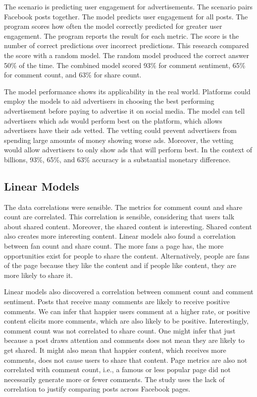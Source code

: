 \documentclass{article}
\begin{document}
The scenario is predicting user engagement for advertisements. The scenario pairs Facebook posts together. The model predicts user engagement for all posts. The program scores how often the model correctly predicted for greater user engagement. The program reports the result for each metric. The score is the number of correct predictions over incorrect predictions. This research compared the score with a random model. The random model produced the correct answer 50\% of the time. The combined model scored 93\% for comment sentiment, 65\% for comment count, and 63\% for share count.

The model performance shows its applicability in the real world.  Platforms could employ the models to aid advertisers in choosing the best performing advertisement before paying to advertise it on social media. The model can tell advertisers which ads would perform best on the platform, which allows advertisers have their ads vetted. The vetting could prevent advertisers from spending large amounts of money showing worse ads. Moreover, the vetting would allow advertisers to only show ads that will perform best. In the context of billions, 93\%, 65\%, and 63\% accuracy is a substantial monetary difference.

\subsection{Linear Models}
The data correlations were sensible. The metrics for comment count and share count are correlated. This correlation is sensible, considering that users talk about shared content. Moreover, the shared content is interesting. Shared content also creates more interesting content. Linear models also found a correlation between fan count and share count. The more fans a page has, the more opportunities exist for people to share the content. Alternatively, people are fans of the page because they like the content and if people like content, they are more likely to share it. 

Linear models also discovered a correlation between comment count and comment sentiment. Posts that receive many comments are likely to receive positive comments. We can infer that happier users comment at a higher rate, or positive content elicits more comments, which are also likely to be positive. Interestingly, comment count was not correlated to share count. One might infer that just because a post draws attention and comments does not mean they are likely to get shared. It might also mean that happier content, which receives more comments, does not cause users to share that content. Page metrics are also not correlated with comment count, i.e., a famous or less popular page did not necessarily generate more or fewer comments. The study uses the lack of correlation to justify comparing posts across Facebook pages.
\end{document}
